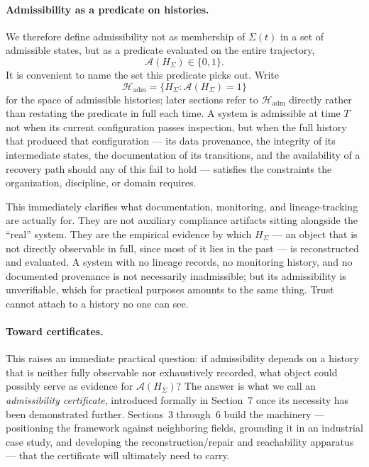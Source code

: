 \documentclass[11pt]{article}
\begin{document}
\paragraph{Admissibility as a predicate on histories.} We therefore define admissibility not as membership of $\Sigma(t)$ in a set of admissible states, but as a predicate evaluated on the entire trajectory,
\begin{equation}
\mathcal{A}(H_\Sigma) \in \{0, 1\}.
\end{equation}
It is convenient to name the set this predicate picks out. Write
\begin{equation}
\mathcal{H}_{\mathrm{adm}} = \{H_\Sigma : \mathcal{A}(H_\Sigma) = 1\}
\end{equation}
for the space of admissible histories; later sections refer to $\mathcal{H}_{\mathrm{adm}}$ directly rather than restating the predicate in full each time. A system is admissible at time $T$ not when its current configuration passes inspection, but when the full history that produced that configuration --- its data provenance, the integrity of its intermediate states, the documentation of its transitions, and the availability of a recovery path should any of this fail to hold --- satisfies the constraints the organization, discipline, or domain requires.

This immediately clarifies what documentation, monitoring, and lineage-tracking are actually for. They are not auxiliary compliance artifacts sitting alongside the ``real'' system. They are the empirical evidence by which $H_\Sigma$ --- an object that is not directly observable in full, since most of it lies in the past --- is reconstructed and evaluated. A system with no lineage records, no monitoring history, and no documented provenance is not necessarily inadmissible; but its admissibility is unverifiable, which for practical purposes amounts to the same thing. Trust cannot attach to a history no one can see.

\paragraph{Toward certificates.} This raises an immediate practical question: if admissibility depends on a history that is neither fully observable nor exhaustively recorded, what object could possibly serve as evidence for $\mathcal{A}(H_\Sigma)$? The answer is what we call an \emph{admissibility certificate}, introduced formally in Section~7 once its necessity has been demonstrated further. Sections~3 through~6 build the machinery --- positioning the framework against neighboring fields, grounding it in an industrial case study, and developing the reconstruction/repair and reachability apparatus --- that the certificate will ultimately need to carry.
\end{document}
